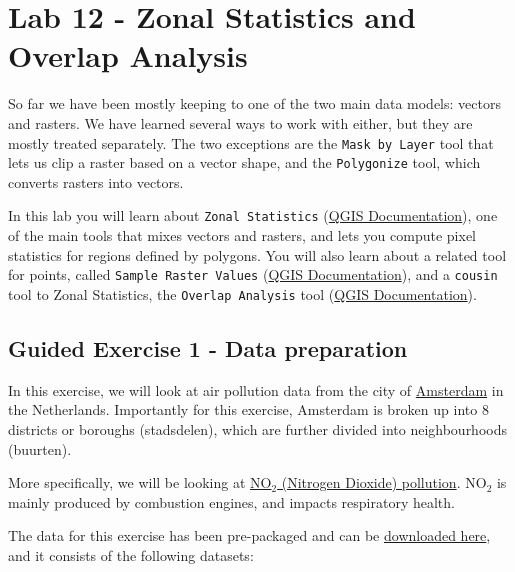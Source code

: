 \documentclass[
  letterpaper,
  DIV=11,
  numbers=noendperiod]{scrreprt}
\begin{document}
\chapter{Lab 12 - Zonal Statistics and Overlap
Analysis}\label{sec-spatan3}

So far we have been mostly keeping to one of the two main data models:
vectors and rasters. We have learned several ways to work with either,
but they are mostly treated separately. The two exceptions are the
\texttt{Mask\ by\ Layer} tool that lets us clip a raster based on a
vector shape, and the \texttt{Polygonize} tool, which converts rasters
into vectors.

In this lab you will learn about \texttt{Zonal\ Statistics}
(\href{https://docs.qgis.org/3.34/en/docs/user_manual/processing_algs/qgis/rasteranalysis.html\#zonal-statistics}{QGIS
Documentation}), one of the main tools that mixes vectors and rasters,
and lets you compute pixel statistics for regions defined by polygons.
You will also learn about a related tool for points, called
\texttt{Sample\ Raster\ Values}
(\href{https://docs.qgis.org/3.34/en/docs/user_manual/processing_algs/qgis/rasteranalysis.html\#sample-raster-values}{QGIS
Documentation}), and a \texttt{cousin} tool to Zonal Statistics, the
\texttt{Overlap\ Analysis} tool
(\href{https://docs.qgis.org/3.34/en/docs/user_manual/processing_algs/qgis/vectoranalysis.html\#overlap-analysis}{QGIS
Documentation}).

\section{Guided Exercise 1 - Data
preparation}\label{guided-exercise-1---data-preparation}

In this exercise, we will look at air pollution data from the city of
\href{https://en.wikipedia.org/wiki/Amsterdam}{Amsterdam} in the
Netherlands. Importantly for this exercise, Amsterdam is broken up into
8 districts or boroughs (stadsdelen), which are further divided into
neighbourhoods (buurten).

More specifically, we will be looking at
\href{https://www.gov.uk/government/statistics/air-quality-statistics/ntrogen-dioxide}{NO\(_2\)
(Nitrogen Dioxide) pollution}. NO\(_2\) is mainly produced by combustion
engines, and impacts respiratory health.

The data for this exercise has been pre-packaged and can be
\href{https://stir-my.sharepoint.com/:u:/g/personal/ala2_stir_ac_uk/ESlllBAgUyBJqNE2dGCSKkoBPKZlxKg-mTw8hjSkG0fpVA?e=Qg4Psg}{downloaded
here}, and it consists of the following datasets:
\end{document}
